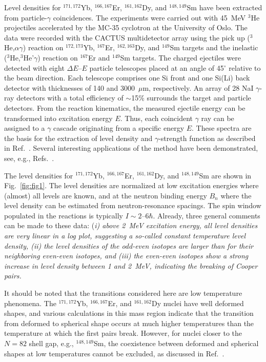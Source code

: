 \begin{multicols}{2}
Level densities for $^{171,172}$Yb, $^{166,167}$Er, $^{161,162}$Dy, and 
$^{148,149}$Sm have been extracted from particle-$\gamma$ coincidences. The 
experiments were carried out with 45~MeV $^3$He projectiles accelerated by the
MC-35 cyclotron at the University of Oslo. The data were recorded with the 
CACTUS multidetector array using the pick up ($^3$He,$\alpha\gamma$) reaction 
on $^{172,173}$Yb, $^{167}$Er, $^{162,163}$Dy, and $^{149}$Sm targets and the 
inelastic ($^3$He,$^3$He'$\gamma$) reaction on $^{167}$Er and $^{149}$Sm 
targets. The charged ejectiles were detected with eight $\Delta E$--$E$ 
particle telescopes placed at an angle of 45$^{\circ}$ relative to the beam 
direction. Each telescope comprises one Si front and one Si(Li) back detector 
with thicknesses of 140 and 3000~$\mu$m, respectively. An array of 28 NaI 
$\gamma$-ray detectors with a total efficiency of $\sim$15\% surrounds the 
target and particle detectors. From the reaction kinematics, the measured 
ejectile energy can be transformed into excitation energy $E$. Thus, each 
coincident $\gamma$ ray can be assigned to a $\gamma$ cascade originating from 
a specific energy $E$. These spectra are the basis for the extraction of level 
density and $\gamma$-strength function as described in Ref.\ \cite{SB00}. 
Several interesting applications of the method have been demonstrated, see, 
e.g., Refs.\ \cite{SB01,MG01,VG01,SG02}.

The level densities for $^{171,172}$Yb, $^{166,167}$Er, $^{161,162}$Dy, and 
$^{148,149}$Sm are shown in Fig.\ \ref{fig:fig1}. The level densities are 
normalized at low excitation energies where (almost) all levels are known, and 
at the neutron binding energy $B_n$ where the level density can be estimated 
from neutron-resonance spacings. The spin window populated in the reactions is 
typically $I\sim 2$--$6\hbar$. Already, three general comments can be made to 
these data: (\em i\rm) above 2~MeV excitation energy, all level densities are 
very linear in a log plot, suggesting a so-called constant temperature level 
density, (\em ii\rm) the level densities of the odd-even isotopes are larger 
than for their neighboring even-even isotopes, and (\em iii\rm) the even-even 
isotopes show a strong increase in level density between 1 and 2~MeV, 
indicating the breaking of Cooper pairs.

It should be noted that the transitions considered here are low temperature 
phenomena. The $^{171,172}$Yb, $^{166,167}$Er, and $^{161,162}$Dy nuclei have 
well deformed shapes, and various calculations in this mass region 
\cite{DK93,WK00,ER00,AS01} indicate that the transition from deformed to 
spherical shape occurs at much higher temperatures than the temperature at 
which the first pairs break. However, for nuclei closer to the $N=82$ shell 
gap, e.g., $^{148,149}$Sm, the coexistence between deformed and spherical 
shapes at low temperatures cannot be excluded, as discussed in Ref.\ 
\cite{ZC99}.


\end{multicols}
